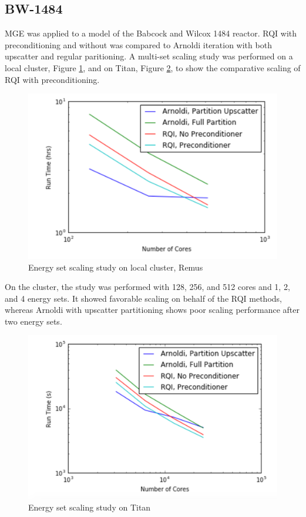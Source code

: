 \documentclass[preprint,12pt]{elsarticle}
\begin{document}
\subsection{BW-1484}
MGE was applied to a model of the Babcock and Wilcox 1484 reactor. RQI with preconditioning and without was compared to Arnoldi iteration with both upscatter and regular paritioning. A multi-set scaling study was performed on a local cluster, Figure \ref{fig:remus}, and on Titan, Figure \ref{fig:titan}, to show the comparative scaling of RQI with preconditioning.
\begin{figure}
\label{fig:remus}
\caption{Energy set scaling study on local cluster, Remus}
\includegraphics[scale=.5]{Remus_Scaling}
\centering
\end{figure}

 On the cluster, the study was performed with 128, 256, and 512 cores and 1, 2, and 4 energy sets. It showed favorable scaling on behalf of the RQI methods, whereas Arnoldi with upscatter partitioning shows poor scaling performance after two energy sets. 

\begin{figure}
\label{fig:titan}
\caption{Energy set scaling study on Titan}
\includegraphics[scale=.5]{Titan_Scaling}
\centering
\end{figure}
\end{document}
